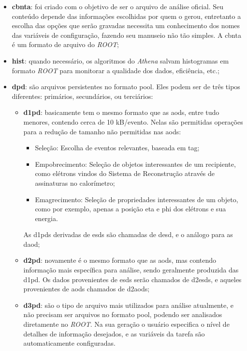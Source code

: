 \begin{itemize}
\item \textbf{\gls{cbnta}}: foi criado com o objetivo de ser o arquivo de
análise oficial. Seu conteúdo depende das informações escolhidas por quem o
gerou, entretanto a escolha das opções que serão gravadas necessita um
conhecimento dos nomes das variáveis de configuração, fazendo seu manuseio não
tão simples. A \gls{cbnta} é um formato de arquivo do \emph{ROOT};
\item \textbf{\gls{hist}}: quando necessário, os algoritmos do \emph{Athena} salvam
histogramas em formato \emph{ROOT} para monitorar a qualidade dos dados, eficiência, etc.;
\item \textbf{\gls{dpd}}: são arquivos persistentes no formato \gls{pool}. Eles
podem ser de três tipos diferentes: primários, secundários, ou terciários:
\begin{itemize}
\item \textbf{\gls{d1pd}}: basicamente tem o mesmo formato que as \glspl{aod},
entre tudo menores, contendo cerca de 10 kB/evento. Nelas são permitidas operações para
a redução de tamanho não permitidas nas \glspl{aod}:
\begin{itemize}
\item Seleção: Escolha de eventos relevantes, baseada em \gls{tag};
\item Empobrecimento: Seleção de objetos interessantes de um recipiente,
como elétrons vindos do Sistema de Reconstrução através de assinaturas no
calorímetro;
\item Emagrecimento: Seleção de propriedades interessantes de um objeto, como
por exemplo, apenas a posição \gls{eta} e \gls{phi} dos elétrons e sua energia.
\end{itemize}
As \glspl{d1pd} derivadas de \glspl{esd} são chamadas de \gls{desd}, e o
análogo para as \gls{daod};
\item \textbf{\gls{d2pd}}: novamente é o mesmo formato que as \glspl{aod}, mas
contendo informação mais específica para análise, sendo geralmente produzida das
\gls{d1pd}. Os dados provenientes de \glspl{esd} serão chamados de
\glspl{d2esd}, e aqueles provenientes de \glspl{aod} chamados de
\glspl{d2aod};
\item \textbf{\gls{d3pd}}: são o tipo de arquivo mais utilizados para análise
atualmente, e não precisam ser arquivos no formato \gls{pool}, podendo ser
analisados diretamente no \emph{ROOT}. Na sua geração o
usuário especifica o nível de detalhes de informação desejados, e as variáveis
da tarefa são automaticamente configuradas.
\end{itemize}
\end{itemize}

